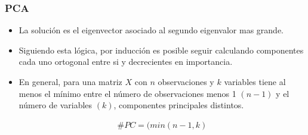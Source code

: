 \documentclass[
  shownotes,
  xcolor={svgnames},
  hyperref={colorlinks,citecolor=DarkBlue,linkcolor=DarkRed,urlcolor=DarkBlue}
  , aspectratio=169]{beamer}
\begin{document}
\begin{frame}
\frametitle{PCA}

\begin{itemize}
\item La solución  es el eigenvector asociado al segundo eigenvalor mas grande.
\medskip
\item Siguiendo esta lógica, por inducción es posible seguir calculando componentes cada uno ortogonal entre si y decrecientes en importancia.
\medskip
\item En general, para una matriz \(X\) con \(n\) observaciones y \(k\) variables tiene al menos el mínimo entre el número de observaciones
menos 1 \((n-1)\) y el número de variables \((k)\), componentes principales distintos.

\begin{align}
\#PC= (min(n-1,k)
\end{align}

\end{itemize}



\end{frame}
\end{document}
